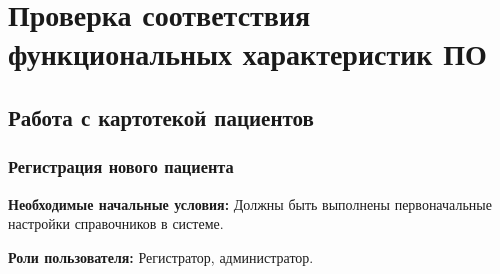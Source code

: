 \newpage
\section{Проверка соответствия функциональных характеристик ПО}
\subsection{Работа с картотекой пациентов}
\subsubsection{Регистрация нового пациента} \label{new_client}

\textbf{Необходимые начальные условия:} Должны быть выполнены первоначальные настройки справочников в системе.

\textbf{Роли пользователя:} Регистратор, администратор.

